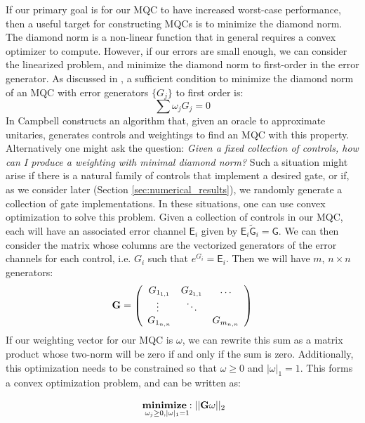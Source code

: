 \documentclass[aps,nofootinbib,pra,notitlepage,twocolumn]{revtex4-1}
\newcommand{\actual}{\ensuremath{\tilde{\mathsf{G}}}}
\newcommand{\target}{\ensuremath{{\mathsf{G}}}}
\newcommand{\error}{\ensuremath{{\mathsf{E}}}}
\begin{document}
If our primary goal is for our MQC to have increased worst-case performance, then a useful target for constructing MQCs is to minimize the diamond norm. The diamond norm is a non-linear function that in general requires a convex optimizer to compute. However, if our errors are small enough, we can consider the linearized problem, and minimize the diamond norm to first-order in the error generator. As discussed in \cite{Campbell2017}, a sufficient condition to minimize the diamond norm of an MQC with error generators $\{G_j\}$ to first order is:
\begin{equation}\label{eq:campbell-condition}
\sum \omega_j G_j = 0
\end{equation}
In \cite{Campbell2017} Campbell constructs an algorithm that, given an oracle to approximate unitaries, generates controls and weightings to find an MQC with this property. Alternatively one might ask the question: \textit{Given a fixed collection of controls, how can I produce a weighting with minimal diamond norm?} Such a situation might arise if there is a natural family of controls that implement a desired gate, or if, as we consider later (Section \ref{sec:numerical_results}), we randomly generate a collection of gate implementations. In these situations, one can use convex optimization to solve this problem. Given a collection of controls in our MQC, each will have an associated error channel $\error_i$ given by $\error_i\actual_i=\target$. We can then consider the matrix whose columns are the vectorized generators of the error channels for each control, i.e. $G_i$ such that $e^{G_i}=\error_i$. Then we will have $m$, $n\times n$ generators:
\begin{equation}\label{eq:vectorized_generators}
	\bold{G} = \left(\begin{array}{cccc}
		G_{1_{1,1}} & G_{2_{1,1}} & \ldots   \\ 
		\vdots\ & \ddots &    \\
		G_{1_{n,n}} &  &  G_{m_{n,n}} \\ 
	\end{array} 	
	\right)
\end{equation}
If our weighting vector for our MQC is $\omega$, we can rewrite this sum as a matrix product whose two-norm will be zero if and only if the sum is zero. Additionally, this optimization needs to be constrained so that $\omega \geq 0$ and $|\omega|_1 = 1$. This forms a convex optimization problem, and can be written as:

\begin{equation}\label{eq:minimization}
  \begin{split}
    &\underset{\omega_j\geq0, |\omega|_1=1}{\textbf{minimize}: } ||\bold{G}\omega||_2\\
  \end{split}
\end{equation}
\end{document}
